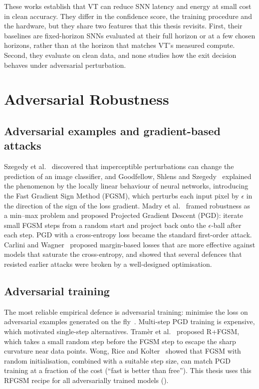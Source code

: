 These works establish that VT can reduce SNN latency and energy at small cost in clean accuracy. They differ in the confidence score, the training procedure and the hardware, but they share two features that this thesis revisits. First, their baselines are fixed-horizon SNNs evaluated at their full horizon or at a few chosen horizons, rather than at the horizon that matches VT's measured compute. Second, they evaluate on clean data, and none studies how the exit decision behaves under adversarial perturbation.

\section{Adversarial Robustness}
\label{sec:rw-adv}

\subsection{Adversarial examples and gradient-based attacks}

Szegedy et al.~\cite{szegedy2014intriguing} discovered that imperceptible perturbations can change the prediction of an image classifier, and Goodfellow, Shlens and Szegedy~\cite{goodfellow2015explaining} explained the phenomenon by the locally linear behaviour of neural networks, introducing the Fast Gradient Sign Method (FGSM), which perturbs each input pixel by $\epsilon$ in the direction of the sign of the loss gradient. Madry et al.~\cite{madry2018towards} framed robustness as a min--max problem and proposed Projected Gradient Descent (PGD): iterate small FGSM steps from a random start and project back onto the $\epsilon$-ball after each step. PGD with a cross-entropy loss became the standard first-order attack. Carlini and Wagner~\cite{carlini2017towards} proposed margin-based losses that are more effective against models that saturate the cross-entropy, and showed that several defences that resisted earlier attacks were broken by a well-designed optimisation.

\subsection{Adversarial training}

The most reliable empirical defence is adversarial training: minimise the loss on adversarial examples generated on the fly~\cite{madry2018towards}. Multi-step PGD training is expensive, which motivated single-step alternatives. Tram\`er et al.~\cite{tramer2018ensemble} proposed R+FGSM, which takes a small random step before the FGSM step to escape the sharp curvature near data points. Wong, Rice and Kolter~\cite{wong2020fast} showed that FGSM with random initialisation, combined with a suitable step size, can match PGD training at a fraction of the cost (``fast is better than free''). This thesis uses this RFGSM recipe for all adversarially trained models ().

